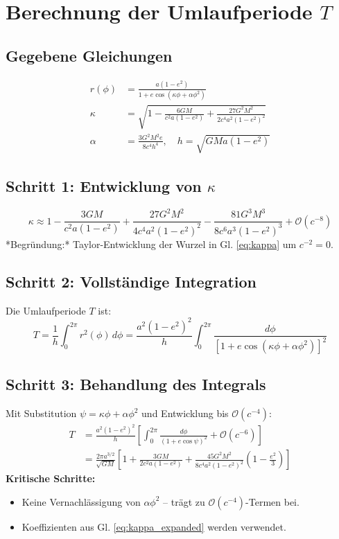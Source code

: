 \newpage
\section{Berechnung der Umlaufperiode \( T \)}

\subsection*{Gegebene Gleichungen}
\begin{align}
r(\phi) &= \frac{a(1-e^2)}{1 + e\cos\left(\kappa\phi + \alpha\phi^2\right)} \label{eq:orbit} \\
\kappa &= \sqrt{1 - \frac{6GM}{c^2a(1-e^2)} + \frac{27G^2M^2}{2c^4a^2(1-e^2)^2}} \label{eq:kappa} \\
\alpha &= \frac{3G^2M^2e}{8c^4h^4}, \quad h = \sqrt{GMa(1-e^2)} \label{eq:alpha}
\end{align}

\subsection*{Schritt 1: Entwicklung von \(\kappa\)}
\begin{equation}
\kappa \approx 1 - \frac{3GM}{c^2a(1-e^2)} + \frac{27G^2M^2}{4c^4a^2(1-e^2)^2} - \frac{81G^3M^3}{8c^6a^3(1-e^2)^3} + \mathcal{O}(c^{-8}) \label{eq:kappa_expanded}
\end{equation}
*Begründung:* Taylor-Entwicklung der Wurzel in Gl. \eqref{eq:kappa} um \(c^{-2} = 0\).

\subsection*{Schritt 2: Vollständige Integration}
Die Umlaufperiode \( T \) ist:
\begin{equation}
T = \frac{1}{h} \int_0^{2\pi} r^2(\phi) \, d\phi = \frac{a^2(1-e^2)^2}{h} \int_0^{2\pi} \frac{d\phi}{\left[1 + e\cos\left(\kappa\phi + \alpha\phi^2\right)\right]^2} \label{eq:T_integral}
\end{equation}

\subsection*{Schritt 3: Behandlung des Integrals}
Mit Substitution \(\psi = \kappa\phi + \alpha\phi^2\) und Entwicklung bis \(\mathcal{O}(c^{-4})\):
\begin{align}
T &= \frac{a^2(1-e^2)^2}{h} \left[ \int_0^{2\pi} \frac{d\phi}{(1 + e\cos\psi)^2} + \mathcal{O}(c^{-6}) \right] \\
  &= \frac{2\pi a^{3/2}}{\sqrt{GM}} \left[1 + \frac{3GM}{2c^2a(1-e^2)} + \frac{45G^2M^2}{8c^4a^2(1-e^2)^2}\left(1 - \frac{e^2}{3}\right)\right] \label{eq:T_final}
\end{align}
\textbf{Kritische Schritte:}
\begin{itemize}
\item Keine Vernachlässigung von \(\alpha\phi^2\) – trägt zu \(\mathcal{O}(c^{-4})\)-Termen bei.
\item Koeffizienten aus Gl. \eqref{eq:kappa_expanded} werden verwendet.
\end{itemize}

